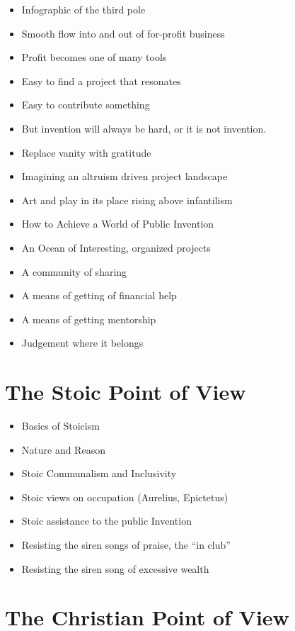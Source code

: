 \documentclass[
	fontsize=10pt, %
	twoside=false, %
	secnumdepth=1, %
]{kaobook}
\begin{document}
\begin{itemize}
\item Infographic of the third pole
\item Smooth flow into and out of for-profit business
\item Profit becomes one of many tools
\item Easy to find a project that resonates
\item Easy to contribute something
\item But invention will always be hard, or it is not invention.
\item Replace vanity with gratitude
\item Imagining an altruism driven project landscape
\item Art and play in its place rising above infantilism
\item How to Achieve a World of Public Invention
\item An Ocean of Interesting, organized projects
\item A community of sharing
\item A means of getting of financial help
\item A means of getting mentorship
\item Judgement where it belongs
\end{itemize}



\chapter{The Stoic Point of View}

\begin{itemize}
\item Basics of Stoicism
\item Nature and Reason
\item Stoic Communalism and Inclusivity
\item Stoic views on occupation (Aurelius, Epictetus)
\item Stoic assistance to the public Invention
\item Resisting the siren songs of praise, the ``in club''
  \item Resisting the siren song of excessive wealth
\end{itemize}

\chapter{The Christian Point of View}
\end{document}
